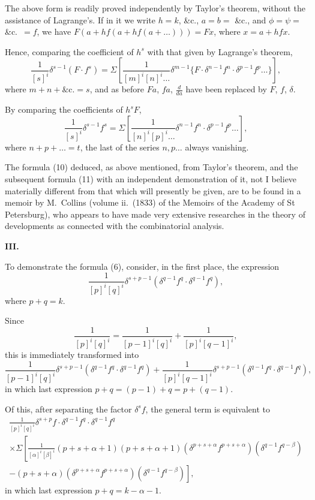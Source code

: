 \documentclass[11pt,a4paper]{book}
\begin{document}
The above form is readily proved independently by Taylor's theorem, without the assistance of Lagrange's. If in it we write $h=k$, \&c., $a=b=$ \&c., and $\phi = \psi =$ \&c.\ $=f$, we have $F(a + hf(a + hf(a + \ldots))) = Fx$, where $x = a + hfx$.

Hence, comparing the coefficient of $h^s$ with that given by Lagrange's theorem,
\begin{equation}
\frac{1}{[s]^i} \delta^{s-1}(F \cdot f^s) = \Sigma \left[ \frac{1}{[m]^i [n]^i \ldots} \delta^{m-1} \{ F \cdot \delta^{n-1} f^n \cdot \delta^{p-1} f^p \ldots \} \right],
\tag{10}
\end{equation}
where $m + n + \&\text{c.} = s$, and as before $Fa$, $fa$, $\frac{d}{da}$ have been replaced by $F$, $f$, $\delta$.

By comparing the coefficients of $h^s F$,
\begin{equation}
\frac{1}{[s]^i} \delta^{s-1} f^s = \Sigma \left[ \frac{1}{[n]^i [p]^i \ldots} \delta^{n-1} f^n \cdot \delta^{p-1} f^p \ldots \right],
\tag{11}
\end{equation}
where $n + p + \ldots = t$, the last of the series $n, p \ldots$ always vanishing.

The formula (10) deduced, as above mentioned, from Taylor's theorem, and the subsequent formula (11) with an independent demonstration of it, not I believe materially different from that which will presently be given, are to be found in a memoir by M.\ Collins (volume ii.\ (1833) of the Memoirs of the Academy of St Petersburg), who appears to have made very extensive researches in the theory of developments as connected with the combinatorial analysis.

\bigskip
\noindent\textbf{III.}

To demonstrate the formula (6), consider, in the first place, the expression
\[ \frac{1}{[p]^i [q]^i} \delta^{s+p-1} (\delta^{q-1} f^q \cdot \delta^{q-1} f^q), \]
where $p + q = k$.

Since
\[ \frac{1}{[p]^i [q]^i} = \frac{1}{[p-1]^i [q]^i} + \frac{1}{[p]^i [q-1]^i}, \]
this is immediately transformed into
\[ \frac{1}{[p-1]^i [q]^i} \delta^{s+p-1} (\delta^{q-1} f^q \cdot \delta^{q-1} f^q) + \frac{1}{[p]^i [q-1]^i} \delta^{s+p-1} (\delta^{q-1} f^q \cdot \delta^{q-1} f^q), \]
in which last expression $p + q = (p-1) + q = p + (q-1)$.

Of this, after separating the factor $\delta^s f$, the general term is equivalent to
\begin{multline*}
\frac{1}{[p]^i [q]^i} \delta^{s+p} f \cdot \delta^{q-1} f^q \cdot \delta^{q-1} f^q \\
\times \Sigma \left[ \frac{1}{[\alpha]^i [\beta]^i} (p+s+\alpha+1)(p+s+\alpha+1)(\delta^{p+s+\alpha} f^{p+s+\alpha})(\delta^{q-1} f^{q-\beta}) \right. \\
\left. - (p+s+\alpha)(\delta^{p+s+\alpha} f^{p+s+\alpha})(\delta^{q-1} f^{q-\beta}) \right],
\end{multline*}
in which last expression $p + q = k - \alpha - 1$.
\end{document}
